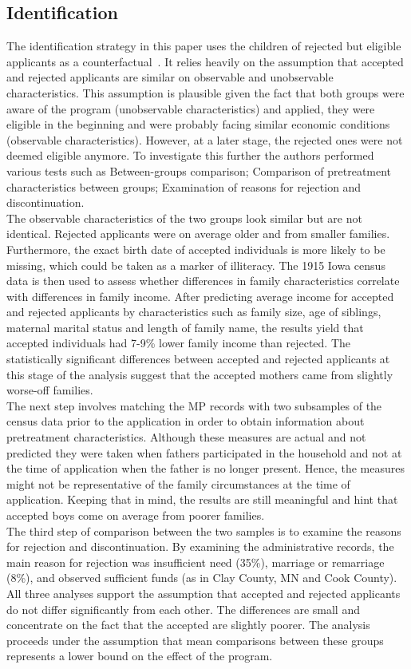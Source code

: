 \subsection{Identification}\label{identification}
The identification strategy in this paper uses the children of rejected
but eligible applicants as a counterfactual~\citep{Bound_1989,Wachter_2011}. It relies heavily on the assumption that
accepted and rejected applicants are similar on observable and
unobservable characteristics. This assumption is plausible given the
fact that both groups were aware of the program (unobservable
characteristics) and applied, they were eligible in the beginning and
were probably facing similar economic conditions (observable
characteristics). However, at a later stage, the rejected ones were not
deemed eligible anymore. To investigate this further the authors
performed various tests such as Between-groups comparison; Comparison
of pretreatment characteristics between groups; Examination of reasons
for rejection and discontinuation.\\
The observable characteristics of the two groups look similar but are
not identical. Rejected applicants were on average older and from
smaller families. Furthermore, the exact birth date of accepted
individuals is more likely to be missing, which could be taken as a
marker of illiteracy. The 1915 Iowa census data is then used to assess
whether differences in family characteristics correlate with differences
in family income. After predicting average income for accepted and
rejected applicants by characteristics such as family size, age of
siblings, maternal marital status and length of family name, the
results yield that accepted individuals had 7-9\% lower family income
than rejected. The statistically significant differences between
accepted and rejected applicants at this stage of the analysis
suggest that the accepted mothers came from slightly worse-off
families.\\
The next step involves matching the MP records with two subsamples of
the census data prior to the application in order to obtain information
about pretreatment characteristics. Although these measures are actual
and not predicted they were taken when fathers participated in the
household and not at the time of application when the father is no
longer present. Hence, the measures might not be representative of the
family circumstances at the time of application. Keeping that in mind,
the results are still meaningful and hint that accepted boys come on
average from poorer families.\\
The third step of comparison between the two samples is to examine the
reasons for rejection and discontinuation. By examining the
administrative records, the main reason for rejection was insufficient
need (35\%), marriage or remarriage (8\%), and observed sufficient funds
(as in Clay County, MN and Cook County).\\
All three analyses support the assumption that accepted and rejected
applicants do not differ significantly from each other. The differences
are small and concentrate on the fact that the accepted are slightly
poorer. The analysis proceeds under the assumption that mean
comparisons between these groups represents a lower bound on the effect
of the program.
